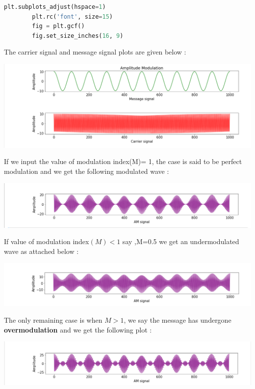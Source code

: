 \documentclass[12pt,a4paper]{article}%
\begin{document}
\begin{flushleft}
\begin{lstlisting}[language=python]
		plt.subplots_adjust(hspace=1)
		plt.rc('font', size=15)
		fig = plt.gcf()
		fig.set_size_inches(16, 9)
		\end{lstlisting}
		The carrier signal and message signal plots are given below :\\
		\begin{center}
			{\includegraphics[width=0.80 \textwidth]{./images/cm.PNG}}\\\bigskip
		\end{center}
		If we input the value of modulation index(M)= 1, the case is said to be perfect modulation and we get the following modulated wave :\\
		\begin{center}
			{\includegraphics[width=0.80 \textwidth]{./images/perfect.PNG}}\\\bigskip
		\end{center}
		If value of modulation index$(M)< 1$ say ,M=0.5 we get an undermodulated wave as attached below : \\
		\begin{center}
			{\includegraphics[width=0.80 \textwidth]{./images/undermodulated.PNG}}\\\bigskip
		\end{center}
		The only remaining case is when $M > 1$, we say the message has undergone \textbf{overmodulation } and we get the following plot :\\
		\begin{center}
			{\includegraphics[width=0.80 \textwidth]{./images/overmodulated.PNG}}\\\bigskip
		\end{center}
	\end{flushleft}
    \pagebreak
\end{document}
